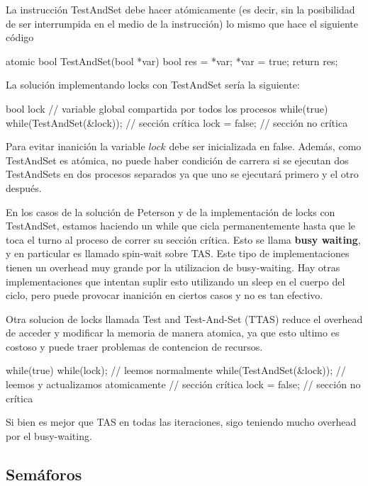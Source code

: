 \documentclass{article}
\begin{document}
La instrucci\'on TestAndSet debe hacer at\'omicamente (es decir, sin la posibilidad de ser interrumpida en el medio de la instrucci\'on) lo mismo que hace el siguiente c\'odigo

\begin{code}
atomic bool TestAndSet(bool *var)
{
    bool res = *var;
		*var = true;
		return res;
}
\end{code}

La soluci\'on implementando locks con TestAndSet ser\'ia la siguiente:

\begin{code}
bool lock // variable global compartida por todos los procesos
while(true)
{
    while(TestAndSet(&lock));
		// sección crítica
		lock = false;
		// sección no crítica
}
\end{code}

Para evitar inanici\'on la variable $lock$ debe ser inicializada en false. Adem\'as, como TestAndSet es at\'omica, no puede haber condici\'on de carrera si se ejecutan dos TestAndSets en dos procesos separados ya que uno se ejecutar\'a primero y el otro despu\'es.

En los casos de la soluci\'on de Peterson y de la implementaci\'on de locks con TestAndSet, estamos haciendo un while que cicla permanentemente hasta que le toca el turno al proceso de correr su secci\'on cr\'itica. Esto se llama \textbf{busy waiting}, y en particular es llamado spin-wait sobre TAS. Este tipo de implementaciones tienen un overhead muy grande por la utilizacion de busy-waiting. Hay otras implementaciones que intentan suplir esto utilizando un sleep en el cuerpo del ciclo, pero puede provocar inanición en ciertos casos y no es tan efectivo.

Otra solucion de locks llamada Test and Test-And-Set (TTAS) reduce el overhead de acceder y modificar la memoria de manera atomica, ya que esto ultimo es costoso y puede traer problemas de contencion de recursos.

\begin{code}
while(true)
{
    while(lock); // leemos normalmente
    while(TestAndSet(&lock)); // leemos y actualizamos atomicamente
		// sección crítica
		lock = false;
		// sección no crítica
}
\end{code}

Si bien es mejor que TAS en todas las iteraciones, sigo teniendo mucho overhead por el busy-waiting.

\subsection{Sem\'aforos}
\end{document}
